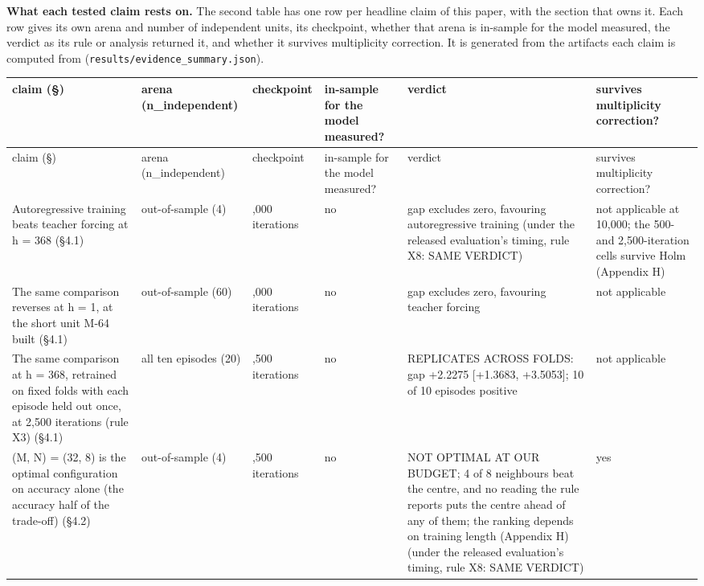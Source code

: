 \documentclass[10pt]{article}
\begin{document}
\textbf{What each tested claim rests on.} The second table has one row per headline claim of this paper, with the section that owns it. Each row gives its own arena and number of independent units, its checkpoint, whether that arena is in-sample for the model measured, the verdict as its rule or analysis returned it, and whether it survives multiplicity correction. It is generated from the artifacts each claim is computed from (\texttt{results/\allowbreak{}evidence\_\allowbreak{}summary\allowbreak{}.json}).

\begingroup\footnotesize\setlength{\tabcolsep}{3pt}
\begin{longtable}{>{\raggedright\arraybackslash}p{}>{\raggedright\arraybackslash}p{}>{\raggedright\arraybackslash}p{}>{\raggedright\arraybackslash}p{}>{\raggedright\arraybackslash}p{}>{\raggedright\arraybackslash}p{}}
\toprule claim (\S{}) & arena (n\_\allowbreak{}independent) & checkpoint & in-sample for the model measured? & verdict & survives multiplicity correction? \\ \midrule\endfirsthead
\toprule claim (\S{}) & arena (n\_\allowbreak{}independent) & checkpoint & in-sample for the model measured? & verdict & survives multiplicity correction? \\ \midrule\endhead
\bottomrule\endlastfoot
Autoregressive training beats teacher forcing at h = 368 (\S{}4.1) & out-of-sample (4) & 10,000 iterations & no & gap excludes zero, favouring autoregressive training (under the released evaluation's timing, rule X8: SAME VERDICT) & not applicable at 10,000; the 500- and 2,500-iteration cells survive Holm (Appendix H) \\
The same comparison reverses at h = 1, at the short unit M-64 built (\S{}4.1) & out-of-sample (60) & 10,000 iterations & no & gap excludes zero, favouring teacher forcing & not applicable \\
The same comparison at h = 368, retrained on fixed folds with each episode held out once, at 2,500 iterations (rule X3) (\S{}4.1) & all ten episodes (20) & 2,500 iterations & no & REPLICATES ACROSS FOLDS: gap +2.2275 [+1.3683, +3.5053]; 10 of 10 episodes positive & not applicable \\
(M, N) = (32, 8) is the optimal configuration on accuracy alone (the accuracy half of the trade-off) (\S{}4.2) & out-of-sample (4) & 2,500 iterations & no & NOT OPTIMAL AT OUR BUDGET; 4 of 8 neighbours beat the centre, and no reading the rule reports puts the centre ahead of any of them; the ranking depends on training length (Appendix H) (under the released evaluation's timing, rule X8: SAME VERDICT) & yes \\

\end{longtable}
\end{document}
